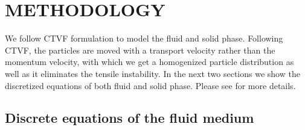 \documentclass[10pt, conference]{FMFP2022}
\begin{document}
\section{\textbf{METHODOLOGY}}\label{sec2}

We follow CTVF formulation to model the fluid and solid phase. Following CTVF,
the particles are moved with a transport velocity rather than the momentum
velocity, with which we get a homogenized particle distribution as well as it
eliminates the tensile instability. In the next two sections we show the
discretized equations of both fluid and solid phase. Please see
\cite{adepu2021corrected} for more details.

\subsection{\textbf{Discrete equations of the fluid medium}}\label{subsec:discrete-fluid}
\end{document}
